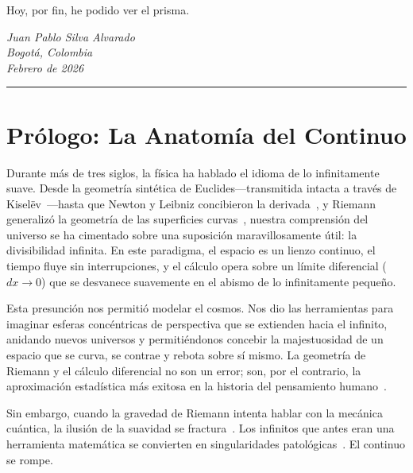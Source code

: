 \documentclass[11pt, a4paper, openany]{book}
\begin{document}
\bigskip

Hoy, por fin, he podido ver el prisma.

\vspace{1cm}
\begin{flushright}
\textit{Juan Pablo Silva Alvarado}\\
\textit{Bogot\'a, Colombia}\\
\textit{Febrero de 2026}
\end{flushright}
\vspace{1cm}
\begin{center}
\rule{0.4\textwidth}{0.5pt}
\end{center}


\chapter*{Pr\'ologo: La Anatom\'ia del Continuo}

Durante m\'as de tres siglos, la f\'isica ha hablado el idioma de lo
infinitamente suave. Desde la geometr\'ia sint\'etica de
Euclides---transmitida intacta a trav\'es de
Kisel\"ev~\cite{kiselev1892}---hasta que Newton y Leibniz concibieron la derivada~\cite{newton1687},
y Riemann generaliz\'o la geometr\'ia de las superficies
curvas~\cite{riemann1854}, nuestra comprensi\'on del universo se ha
cimentado sobre una suposici\'on maravillosamente \'util: la
divisibilidad infinita. En este paradigma, el
espacio es un lienzo continuo, el tiempo fluye sin interrupciones, y el
c\'alculo opera sobre un l\'imite diferencial ($dx \to 0$) que se
desvanece suavemente en el abismo de lo infinitamente peque\~no.

Esta presunci\'on nos permiti\'o modelar el cosmos. Nos dio las
herramientas para imaginar esferas conc\'entricas de perspectiva que se
extienden hacia el infinito, anidando nuevos universos y
permiti\'endonos concebir la majestuosidad de un espacio que se curva, se
contrae y rebota sobre s\'i mismo. La geometr\'ia de Riemann y el
c\'alculo diferencial no son un error; son, por el contrario, la
aproximaci\'on estad\'istica m\'as exitosa en la historia del
pensamiento humano~\cite{penrose2003}.

Sin embargo, cuando la gravedad de Riemann intenta hablar con la
mec\'anica cu\'antica, la ilusi\'on de la suavidad se
fractura~\cite{dewitt1967,goroff1986}. Los infinitos que antes eran una
herramienta matem\'atica se convierten en singularidades
patol\'ogicas~\cite{hawking1970,penrose1965}. El continuo se rompe.
\end{document}
